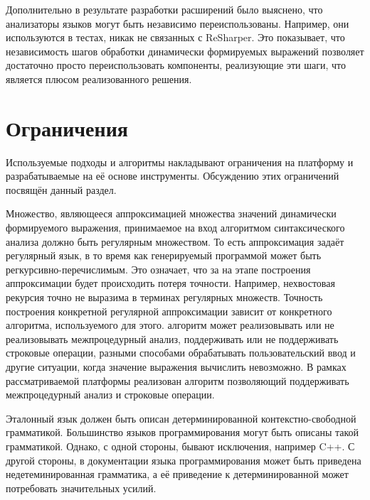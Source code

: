 Дополнительно в результате разработки расширений было выяснено, что анализаторы языков могут быть независимо переиспользованы. Например, они используются в тестах, никак не связанных с ReSharper. Это показывает, что независимость шагов обработки динамически формируемых выражений позволяет достаточно просто переиспользовать компоненты, реализующие эти шаги, что является плюсом реализованного решения.

\section{Ограничения}

Используемые подходы и алгоритмы накладывают ограничения на платформу и разрабатываемые на её основе инструменты. Обсуждению этих ограничений посвящён данный раздел.

Множество, являющееся аппроксимацией множества значений динамически формируемого выражения, принимаемое на вход алгоритмом синтаксического анализа должно быть регулярным множеством. То есть аппроксимация задаёт регулярный язык, в то время как генерируемый программой может быть регкурсивно-перечислимым. Это означает, что за на этапе построения аппроксимации будет происходить потеря точности. Например, нехвостовая рекурсия точно не выразима в терминах регулярных множеств. Точность построения конкретной регулярной аппроксимации зависит от конкретного алгоритма, используемого для этого. алгоритм может реализовывать или не реализовывать межпроцедурный анализ, поддерживать или не поддерживать строковые операции, разными способами обрабатывать пользовательский ввод и другие ситуации, когда значение выражения вычислить невозможно. В рамках рассматриваемой платформы реализован алгоритм позволяющий поддерживать межпроцедурный анализ и строковые операции. 

Эталонный язык должен быть описан детерминированной контекстно-свободной грамматикой. Большинство языков программирования могут быть описаны такой грамматикой. Однако, с одной стороны, бывают исключения, например C++. С другой стороны, в документации языка программирования может быть приведена недетеминированная грамматика, а её приведение к детерминированной может потребовать значительных усилий. 


